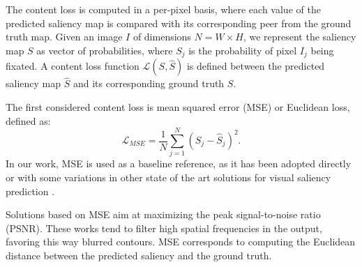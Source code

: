 \documentclass[times,twocolumn,final,authoryear]{elsarticle}
\begin{document}
The content loss is computed in a per-pixel basis, where each value of the predicted saliency map is compared with its corresponding peer from the ground truth map.
Given an image $I$ of dimensions $N = W \times H$, we represent the saliency map $S$ as vector of probabilities, where $S_{j}$ is the probability of pixel $I_j$ being fixated. A content loss function $\mathcal{L}(S,\hat{S})$ is defined between the predicted saliency map $\hat{S}$ and its corresponding ground truth $S$.

The first considered content loss is mean squared error (MSE) or Euclidean loss, defined as:
%
\begin{equation}
\mathcal{L}_{MSE} = 
\frac{1}{N}
\sum_{j=1}^{N} (S_j - \hat{S}_j)^{2}.
\end{equation}
In our work, MSE is used as a baseline reference, as it has been adopted directly or with some variations in other state of the art solutions for visual saliency prediction \citep{Pan_2016_CVPR,mlnet2016}.

Solutions based on MSE aim at maximizing the peak signal-to-noise ratio (PSNR).
These works tend to filter high spatial frequencies in the output, favoring this way blurred contours.
MSE corresponds to computing the Euclidean distance between the predicted saliency and the ground truth.
\end{document}
